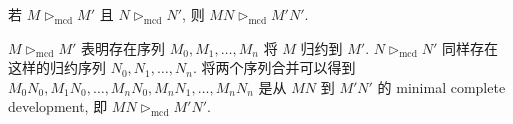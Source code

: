\begin{problem}
若 $M \rhd_\text{mcd} M'$ 且 $N \rhd_\text{mcd} N'$, 则 $M N \rhd_\text{mcd} M' N'$.
\end{problem}

\begin{solution}
$M \rhd_\text{mcd} M'$ 表明存在序列 $M_0, M_1, \dots, M_n$ 将 $M$ 归约到 $M'$. $N \rhd_\text{mcd} N'$ 同样存在这样的归约序列 $N_0, N_1, \dots, N_n$. 将两个序列合并可以得到 $M_0 N_0, M_1 N_0, \dots, M_n N_0, M_n N_1, \dots, M_n N_n$ 是从 $MN$ 到 $M'N'$ 的 minimal complete development, 即 $M N \rhd_\text{mcd} M' N'$.
\end{solution}
